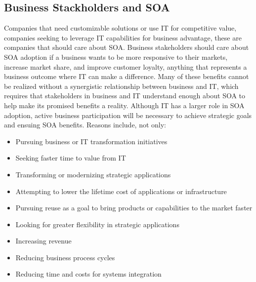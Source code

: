 \documentclass[12pt,a4paper,final,twoside,onecolumn,titlepage]{book}
\begin{document}
\subsection{Business Stackholders and SOA}
Companies that need customizable solutions or use IT for competitive value, companies seeking to leverage IT capabilities for business advantage, these are companies that should care about \gls{SOA}. Business stakeholders should care about \gls{SOA} adoption if a business wants to be more responsive to their markets, increase market share, and improve customer loyalty, anything that represents a business outcome where IT can make a difference. Many of these benefits cannot be realized without a synergistic relationship between business and IT, which requires that stakeholders in business and IT understand enough about \gls{SOA} to help make its promised benefits a reality. Although IT has a larger role in \gls{SOA} adoption, active business participation will be necessary to achieve strategic goals and ensuing \gls{SOA} benefits. Reasons include, not only:
\begin{itemize}
\item Pursuing business or IT transformation initiatives
\item Seeking faster time to value from IT
\item Transforming or modernizing strategic applications
\item Attempting to lower the lifetime cost of applications or infrastructure
\item Pursuing reuse as a goal to bring products or capabilities to the market faster
\item Looking for greater flexibility in strategic applications
\item Increasing revenue
\item Reducing business process cycles
\item Reducing time and costs for systems integration
\end{itemize}
\end{document}
